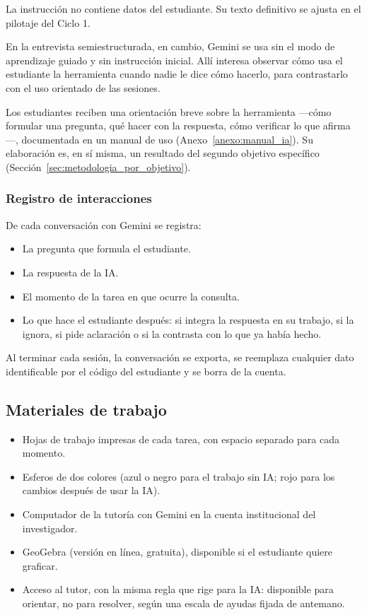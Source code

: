 La instrucción no contiene datos del estudiante. Su texto definitivo se ajusta en el pilotaje del Ciclo 1.

En la entrevista semiestructurada, en cambio, Gemini se usa sin el modo de aprendizaje guiado y sin instrucción inicial. Allí interesa observar cómo usa el estudiante la herramienta cuando nadie le dice cómo hacerlo, para contrastarlo con el uso orientado de las sesiones.

Los estudiantes reciben una orientación breve sobre la herramienta ---cómo formular una pregunta, qué hacer con la respuesta, cómo verificar lo que afirma---, documentada en un manual de uso (Anexo~\ref{anexo:manual_ia}). Su elaboración es, en sí misma, un resultado del segundo objetivo específico (Sección~\ref{sec:metodologia_por_objetivo}).

\subsubsection{Registro de interacciones}

De cada conversación con Gemini se registra:

\begin{itemize}
\item La pregunta que formula el estudiante.
\item La respuesta de la IA.
\item El momento de la tarea en que ocurre la consulta.
\item Lo que hace el estudiante después: si integra la respuesta en su trabajo, si la ignora, si pide aclaración o si la contrasta con lo que ya había hecho.
\end{itemize}

Al terminar cada sesión, la conversación se exporta, se reemplaza cualquier dato identificable por el código del estudiante y se borra de la cuenta.

\subsection{Materiales de trabajo}

\begin{itemize}
\item Hojas de trabajo impresas de cada tarea, con espacio separado para cada momento.
\item Esferos de dos colores (azul o negro para el trabajo sin IA; rojo para los cambios después de usar la IA).
\item Computador de la tutoría con Gemini en la cuenta institucional del investigador.
\item GeoGebra (versión en línea, gratuita), disponible si el estudiante quiere graficar.
\item Acceso al tutor, con la misma regla que rige para la IA: disponible para orientar, no para resolver, según una escala de ayudas fijada de antemano.
\end{itemize}

